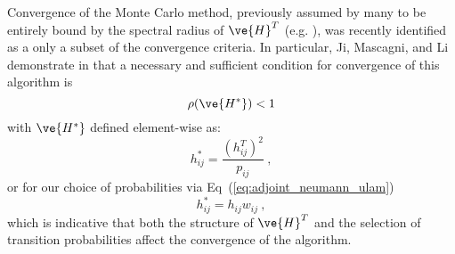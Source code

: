 \documentclass[letterpaper,11pt]{article}
\begin{document}
Convergence of the Monte Carlo method, previously assumed by many to
be entirely bound by the spectral radius of $\ve{H}^T$
(e.g. \cite{spanier_monte_1969}), was recently identified as a only a
subset of the convergence criteria. In particular, Ji, Mascagni, and
Li demonstrate in \cite{ji_2013} that a necessary and sufficient
condition for convergence of this algorithm is 
\begin{equation}
  \rho(\ve{H^*}) < 1
  \label{eq:necessary_condition}
\end{equation} 
with $\ve{H^*}$ defined element-wise as:
\begin{equation}
  h^*_{ij} = \frac{(h^T_{ij})^2}{p_{ij}}\:,
  \label{eq:condition_values}
\end{equation}
or for our choice of probabilities via
Eq~(\ref{eq:adjoint_neumann_ulam})
\begin{equation}
  h^*_{ij} = h_{ij} w_{ij}\:,
  \label{eq:h_star}
\end{equation}
which is indicative that both the structure of $\ve{H}^T$ and the
selection of transition probabilities affect the convergence of the
algorithm.
\end{document}
